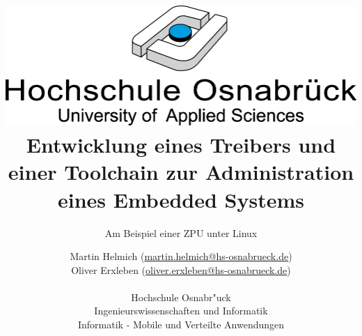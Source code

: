 \documentclass[11pt]{scrartcl}
\begin{document}
\author{%
	Martin Helmich \small(\href{mailto:martin.helmich@hs-osnabrueck.de}{martin.helmich@hs-osnabrueck.de})\\%
	Oliver Erxleben \small(\href{mailto:oliver.erxleben@hs-osnabrueck.de}{oliver.erxleben@hs-osnabrueck.de})\\ \\%
	Hochschule Osnabr"uck \\%
	Ingenieurswissenschaften und Informatik \\%
	Informatik - Mobile und Verteilte Anwendungen }

\title{\includegraphics[scale=0.75,keepaspectratio]{images/hs_os.png}\linebreak \linebreak Entwicklung eines Treibers und einer Toolchain zur Administration eines Embedded Systems}
\subtitle{Am Beispiel einer ZPU unter Linux}

\maketitle
\thispagestyle{empty}
\pagebreak
\tableofcontents
\thispagestyle{empty}
\listoffigures

\lstlistoflistings
\end{document}
